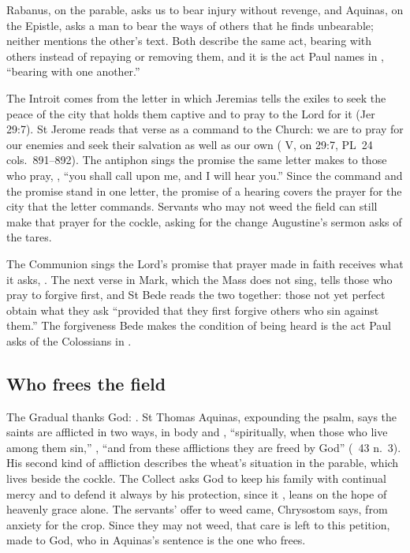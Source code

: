 Rabanus, on the parable, asks us to bear injury without revenge, and Aquinas,
on the Epistle, asks a man to bear the ways of others that he finds
unbearable; neither mentions the other's text. Both describe the same act,
bearing with others instead of repaying or removing them, and it is the act
Paul names in , ``bearing with one another.''

The Introit comes from the letter in which Jeremias tells the exiles to seek
the peace of the city that holds them captive and to pray to the Lord for it
(Jer 29:7). St Jerome reads that verse as a command to the Church: we are to
pray for our enemies and seek their salvation as well as our own
( V, on 29:7, PL~24 cols.~891--892). The antiphon sings
the promise the same letter makes to those who pray, , ``you shall call upon me, and I will hear you.'' Since
the command and the promise stand in one letter, the promise of a hearing
covers the prayer for the city that the letter commands. Servants who may not
weed the field can still make that prayer for the cockle, asking for the
change Augustine's sermon asks of the tares.

The Communion sings the Lord's promise that prayer made in faith receives
what it asks, . The
next verse in Mark, which the Mass does not sing, tells
those who pray to forgive first, and St Bede reads the two together: those
not yet perfect obtain what they ask ``provided that they first forgive
others who sin against them.'' The forgiveness Bede makes the condition of
being heard is the act Paul asks of the Colossians in .

\subsection{Who frees the field}
\label{sec:patience-who-frees}

The Gradual thanks God: . St Thomas Aquinas, expounding the psalm, says the
saints are afflicted in two ways, in body and , ``spiritually, when those who live among
them sin,'' , ``and from
these afflictions they are freed by God'' (\ 43 n.~3).
His second kind of affliction describes the wheat's situation in the parable,
which lives beside the cockle. The Collect asks God to keep his family with
continual mercy and to defend it always by his protection, since it
, leans on the hope of heavenly
grace alone. The servants' offer to weed came, Chrysostom says, from anxiety
for the crop. Since they may not weed, that care is left to this petition,
made to God, who in Aquinas's sentence is the one who frees.

